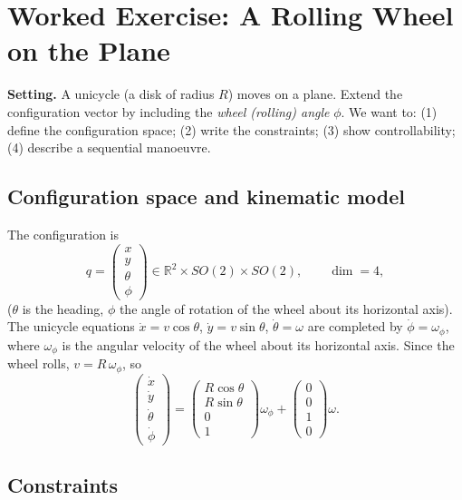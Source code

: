 \documentclass[11pt,a4paper]{article}
\def\bm#1{#1}%
\newcommand{\R}{\mathbb{R}}
\newcommand{\qv}{\bm{q}}
\theoremstyle{definition}
\theoremstyle{plain}
\theoremstyle{remark}
\begin{document}
\section{Worked Exercise: A Rolling Wheel on the Plane}

\textbf{Setting.} A unicycle (a disk of radius $R$) moves on a plane. Extend the configuration vector by including the \emph{wheel (rolling) angle} $\phi$. We want to: (1) define the configuration space; (2) write the constraints; (3) show controllability; (4) describe a sequential manoeuvre.

\subsection{Configuration space and kinematic model}

The configuration is
\[
 \qv=\begin{pmatrix}x\\y\\\theta\\\phi\end{pmatrix}\in\R^2\times SO(2)\times SO(2),\qquad \dim=4 ,
\]
($\theta$ is the heading, $\phi$ the angle of rotation of the wheel about its horizontal axis). The unicycle equations $\dot x=v\cos\theta$, $\dot y=v\sin\theta$, $\dot\theta=\omega$ are completed by $\dot\phi=\omega_\phi$, where $\omega_\phi$ is the angular velocity of the wheel about its horizontal axis. Since the wheel rolls, $v=R\,\omega_\phi$, so
\[
 \begin{pmatrix}\dot x\\\dot y\\\dot\theta\\\dot\phi\end{pmatrix}
 =\begin{pmatrix}R\cos\theta\\R\sin\theta\\0\\1\end{pmatrix}\omega_\phi
 +\begin{pmatrix}0\\0\\1\\0\end{pmatrix}\omega .
\]

\subsection{Constraints}
\end{document}
